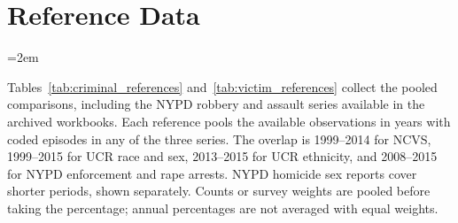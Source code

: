 \clearpage
\section{Reference Data}
\label{si_references}
\begingroup
\emergencystretch=2em

Tables~\ref{tab:criminal_references} and~\ref{tab:victim_references} collect the pooled comparisons, including the NYPD robbery and assault series available in the archived workbooks. Each reference pools the available observations in years with coded episodes in any of the three series. The overlap is 1999--2014 for NCVS, 1999--2015 for UCR race and sex, 2013--2015 for UCR ethnicity, and 2008--2015 for NYPD enforcement and rape arrests. NYPD homicide sex reports cover shorter periods, shown separately. Counts or survey weights are pooled before taking the percentage; annual percentages are not averaged with equal weights.

